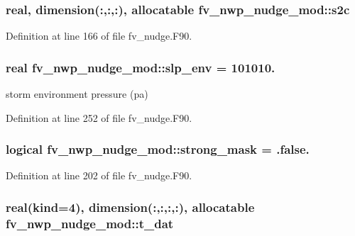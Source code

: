 \subsubsection[{s2c}]{\setlength{\rightskip}{0pt plus 5cm}real, dimension(\-:,\-:,\-:), allocatable fv\-\_\-nwp\-\_\-nudge\-\_\-mod\-::s2c\hspace{0.3cm}{\ttfamily [private]}}\label{classfv__nwp__nudge__mod_a7d0277a732966ffab67f5853b8da70a5}


Definition at line 166 of file fv\-\_\-nudge.\-F90.

\subsubsection[{slp\-\_\-env}]{\setlength{\rightskip}{0pt plus 5cm}real fv\-\_\-nwp\-\_\-nudge\-\_\-mod\-::slp\-\_\-env = 101010.\hspace{0.3cm}{\ttfamily [private]}}\label{classfv__nwp__nudge__mod_aeae3cc750d917e17328d4ea8de151d6e}


storm environment pressure (pa) 



Definition at line 252 of file fv\-\_\-nudge.\-F90.

\subsubsection[{strong\-\_\-mask}]{\setlength{\rightskip}{0pt plus 5cm}logical fv\-\_\-nwp\-\_\-nudge\-\_\-mod\-::strong\-\_\-mask = .false.\hspace{0.3cm}{\ttfamily [private]}}\label{classfv__nwp__nudge__mod_a8514b5b22545a48edbde79b6cc213a2b}


Definition at line 202 of file fv\-\_\-nudge.\-F90.

\subsubsection[{t\-\_\-dat}]{\setlength{\rightskip}{0pt plus 5cm}real(kind=4), dimension(\-:,\-:,\-:,\-:), allocatable fv\-\_\-nwp\-\_\-nudge\-\_\-mod\-::t\-\_\-dat\hspace{0.3cm}{\ttfamily [private]}}\label{classfv__nwp__nudge__mod_afa50769b448c5878d107da994e63d234}


